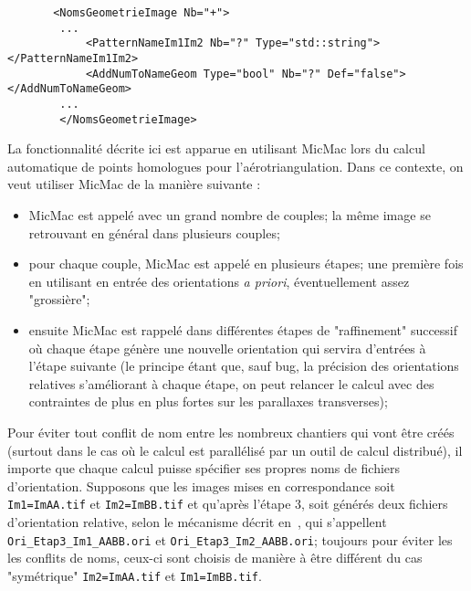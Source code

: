 \begin{verbatim}
       <NomsGeometrieImage Nb="+">
        ...
            <PatternNameIm1Im2 Nb="?" Type="std::string"> </PatternNameIm1Im2>
            <AddNumToNameGeom Type="bool" Nb="?" Def="false"> </AddNumToNameGeom>
        ...
        </NomsGeometrieImage>
\end{verbatim}

La fonctionnalit\'e d\'ecrite ici est apparue en 
utilisant MicMac lors du calcul automatique de points 
homologues pour l'a\'erotriangulation. Dans ce contexte,
on veut utiliser MicMac de la mani\`ere suivante :

\begin{itemize}
   \item MicMac est appel\'e avec un grand nombre de couples;
         la m\^eme image se retrouvant en g\'en\'eral dans 
          plusieurs couples;

   \item pour chaque couple, MicMac est appel\'e en plusieurs \'etapes; 
         une premi\`ere fois en utilisant en entr\'ee des orientations 
         \emph{a priori}, \'eventuellement assez "grossi\`ere"; 

   \item ensuite MicMac est rappel\'e dans diff\'erentes \'etapes de 
         "raffinement" successif o\`u chaque \'etape g\'en\`ere une nouvelle
          orientation qui servira d'entr\'ees \`a l'\'etape suivante
          (le principe \'etant que, sauf bug, la pr\'ecision des orientations
          relatives s'am\'eliorant \`a chaque \'etape, on peut relancer le
          calcul avec des contraintes de plus en plus fortes sur les parallaxes
          transverses);
\end{itemize}

Pour \'eviter tout conflit de nom entre les nombreux chantiers qui vont
\^etre cr\'e\'es (surtout dans le cas o\`u le calcul est parall\'elis\'e
par un outil de calcul distribu\'e), il importe que chaque calcul
puisse sp\'ecifier ses propres noms de fichiers d'orientation.
Supposons  que les images mises en correspondance
soit {\tt Im1=ImAA.tif} et {\tt Im2=ImBB.tif} et qu'apr\`es l'\'etape $3$,
soit g\'en\'er\'es deux fichiers d'orientation relative, selon le
m\'ecanisme d\'ecrit en~\RefFantome, qui s'appellent 
{\tt Ori\_Etap3\_Im1\_AABB.ori} et {\tt  Ori\_Etap3\_Im2\_AABB.ori};
toujours pour \'eviter les
les conflits de noms, ceux-ci sont choisis de mani\`ere \`a \^etre
diff\'erent du cas "sym\'etrique" {\tt Im2=ImAA.tif}  et {\tt Im1=ImBB.tif}.

